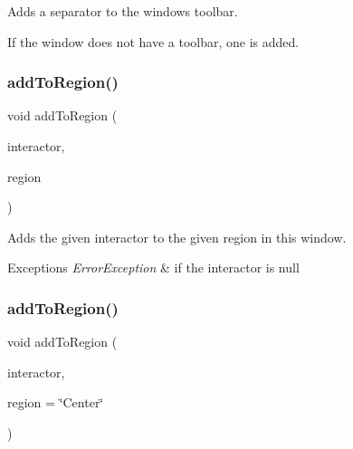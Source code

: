 Adds a separator to the window\textquotesingle{}s toolbar. 

If the window does not have a toolbar, one is added. \mbox{\label{classsgl_1_1GWindow_aab55413917cdbb2e0560ab415d59fd1f}} 
\subsubsection{\texorpdfstring{add\+To\+Region()}{addToRegion()}\hspace{0.1cm}{\footnotesize\ttfamily [1/4]}}
{\footnotesize\ttfamily void add\+To\+Region (\begin{DoxyParamCaption}\item[{\mbox{\hyperlink{classsgl_1_1GInteractor}{G\+Interactor}} $\ast$}]{interactor,  }\item[{\mbox{\hyperlink{classsgl_1_1GWindow_a81a01a86de31071a92e6cce0bab9bc4b}{Region}}}]{region }\end{DoxyParamCaption})\hspace{0.3cm}{\ttfamily [virtual]}}



Adds the given interactor to the given region in this window. 


\begin{DoxyExceptions}{Exceptions}
{\em Error\+Exception} & if the interactor is null \\
\hline
\end{DoxyExceptions}
\mbox{\label{classsgl_1_1GWindow_a9c8e600889001e6e72d3548918a6baff}} 
\subsubsection{\texorpdfstring{add\+To\+Region()}{addToRegion()}\hspace{0.1cm}{\footnotesize\ttfamily [2/4]}}
{\footnotesize\ttfamily void add\+To\+Region (\begin{DoxyParamCaption}\item[{\mbox{\hyperlink{classsgl_1_1GInteractor}{G\+Interactor}} $\ast$}]{interactor,  }\item[{const std\+::string \&}]{region = {\ttfamily \char`\"{}Center\char`\"{}} }\end{DoxyParamCaption})\hspace{0.3cm}{\ttfamily [virtual]}}



